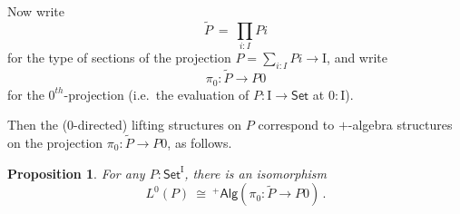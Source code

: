 \documentclass[11pt]{article}
\newcommand{\Set}{\ensuremath{\mathsf{Set}}}
\newcommand{\plusalg}[1]{\ensuremath{^+\!\mathsf{Alg}{(#1)}}}
\newcommand{\plusalgx}{\ensuremath{^+\!\mathsf{Alg}}}
\newcommand{\mono}{\ensuremath{\rightarrowtail}}
\newcommand{\I}{\ensuremath{\mathrm{I}}}
\newtheorem{proposition}[theorem]{Proposition}
\theoremstyle{remark}
\theoremstyle{definition}
\begin{document}
Now write 
\[
\widetilde{P}\ =\ \prod_{i:I}Pi
\]
for the type of sections of the projection $P = \sum_{i:I}Pi \to \I$, and write
\[
\pi_0 : \widetilde{P} \to P0
\]
for the $0^{th}$-projection (i.e.\ the evaluation of $P : \I\to\Set$ at $0:\I$).

Then the (0-directed) lifting structures on $P$ correspond to $+$-algebra structures on the projection $\pi_0 : \widetilde{P} \to P0$, as follows.

\begin{proposition}
For any $ P : \Set^\I$, there is an isomorphism
\[
L^0(P)\ \cong\ \plusalg{\pi_0 : \widetilde{P} \to P0}\,.
\]
\end{proposition}
%
\end{document}
